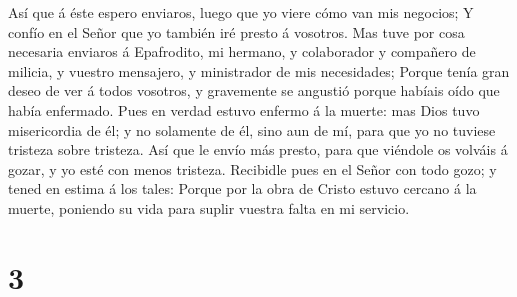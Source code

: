  Así que á éste espero enviaros, luego que yo viere cómo
van mis negocios;  Y confío en el Señor que yo también
iré presto á vosotros.  Mas tuve por cosa necesaria
enviaros á Epafrodito, mi hermano, y colaborador y compañero de milicia,
y vuestro mensajero, y ministrador de mis necesidades; 
Porque tenía gran deseo de ver á todos vosotros, y gravemente se
angustió porque habíais oído que había enfermado.  Pues
en verdad estuvo enfermo á la muerte: mas Dios tuvo misericordia de él;
y no solamente de él, sino aun de mí, para que yo no tuviese tristeza
sobre tristeza.  Así que le envío más presto, para que
viéndole os volváis á gozar, y yo esté con menos tristeza.
 Recibidle pues en el Señor con todo gozo; y tened en
estima á los tales:  Porque por la obra de Cristo estuvo
cercano á la muerte, poniendo su vida para suplir vuestra falta en mi
servicio.

\hypertarget{section-2}{%
\section{3}\label{section-2}}

